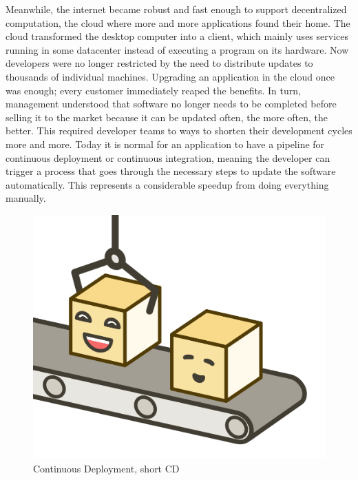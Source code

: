 Meanwhile, the internet became robust and fast enough to support decentralized computation, the cloud where more and more applications found their home. The cloud transformed the desktop computer into a client, which mainly uses services running in some datacenter instead of executing a program on its hardware. Now developers were no longer restricted by the need to distribute updates to thousands of individual machines. Upgrading an application in the cloud once was enough; every customer immediately reaped the benefits. In turn, management understood that software no longer needs to be completed before selling it to the market because it can be updated often, the more often, the better. This required developer teams to ways to shorten their development cycles more and more. Today it is normal for an application to have a pipeline for continuous deployment or continuous integration, meaning the developer can trigger a process that goes through the necessary steps to update the software automatically. This represents a considerable speedup from doing everything manually.

\begin{figure}[ht]
  \centering
  \includegraphics[width=0.3\linewidth]{assets/illustration-microservice-cd.png}
  \caption{Continuous Deployment, short CD}
\end{figure}

